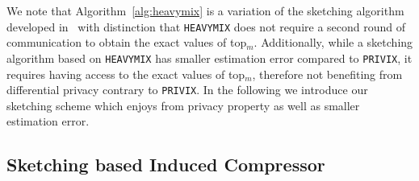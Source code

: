 \documentclass[twoside]{article}
\newtheorem{lemma}{Lemma}
\begin{document}
We note that Algorithm~\ref{alg:heavymix} is a variation of the sketching algorithm developed in~\cite{ivkin2019communication} with distinction that \texttt{HEAVYMIX} does not require a second round of communication to obtain the exact values of top$_m$. 
Additionally, while a sketching algorithm based on \texttt{HEAVYMIX} has smaller estimation error compared to \texttt{PRIVIX}, it requires having access to the exact values of top$_m$, therefore not benefiting from differential privacy contrary to \texttt{PRIVIX}. 
In the following we introduce our sketching scheme which enjoys from privacy property as well as smaller estimation error. 

\vspace{-0.05in}
\subsection{Sketching based Induced Compressor}
\vspace{-0.05in}
\end{document}
